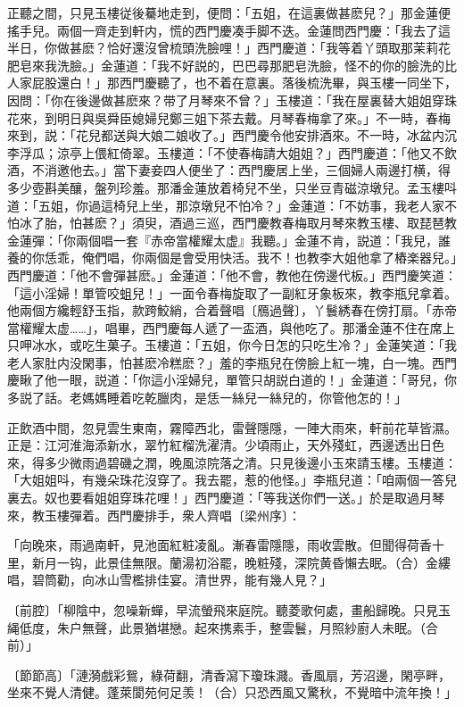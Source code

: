 正聽之間，只見玉樓従後驀地走到，便問：「五姐，在這裏做甚麽兒？」那金蓮便搖手兒。兩個一齊走到軒内，慌的西門慶凑手脚不迭。金蓮問西門慶：「我去了這半日，你做甚麽？恰好還沒曾梳頭洗臉哩！」西門慶道：「我等着丫頭取那茉莉花肥皂來我洗臉。」金蓮道：「我不好説的，巴巴尋那肥皂洗臉，怪不的你的臉洗的比人家屁股還白！」那西門慶聽了，也不着在意裏。落後梳洗畢，與玉樓一同坐下，因問：「你在後邊做甚麽來？带了月琴來不曾？」玉樓道：「我在屋裏替大姐姐穿珠花來，到明日與吳舜臣媳婦兒鄭三姐下茶去戴。月琴春梅拿了來。」不一時，春梅來到，説：「花兒都送與大娘二娘收了。」西門慶令他安排酒來。不一時，冰盆内沉李浮瓜；涼亭上偎紅倚翠。玉樓道：「不使春梅請大姐姐？」西門慶道：「他又不飲酒，不消邀他去。」當下妻妾四人便坐了：西門慶居上坐，三個婦人兩邊打横，得多少壺斟美釀，盤列珍羞。那潘金蓮放着椅兒不坐，只坐豆青磁涼墩兒。孟玉樓呌道：「五姐，你過這椅兒上坐，那涼墩兒不怕冷？」金蓮道：「不妨事，我老人家不怕冰了胎，怕甚麽？」須臾，酒過三巡，西門慶教春梅取月琴來教玉樓、取琵琶教金蓮彈：「你兩個唱一套『赤帝當權耀太虚』我聽。」金蓮不肯，説道：「我兒，誰養的你恁乖，俺們唱，你兩個是會受用快活。我不！也教李大姐他拿了樁楽器兒。」西門慶道：「他不會彈甚麽。」金蓮道：「他不會，教他在傍邊代板。」西門慶笑道：「這小淫婦！單管咬蛆兒！」一面令春梅旋取了一副紅牙象板來，教李瓶兒拿着。他兩個方纔輕舒玉指，款跨鮫綃，合着聲唱〔鴈過聲〕，丫鬟綉春在傍打扇。「赤帝當權耀太虚……」，唱畢，西門慶每人遞了一盃酒，與他吃了。那潘金蓮不住在席上只呷冰水，或吃生菓子。玉樓道：「五姐，你今日怎的只吃生冷？」金蓮笑道：「我老人家肚内没閑事，怕甚麽冷糕麽？」羞的李瓶兒在傍臉上紅一塊，白一塊。西門慶瞅了他一眼，説道：「你這小淫婦兒，單管只胡説白道的！」金蓮道：「哥兒，你多説了話。老媽媽睡着吃乾臘肉，是恁一絲兒一絲兒的，你管他怎的！」

正飲酒中間，忽見雲生東南，霧障西北，雷聲隱隱，一陣大雨來，軒前花草皆濕。正是：江河淮海添新水，翠竹紅榴洗濯清。少頃雨止，天外殘虹，西邊透出日色來，得多少微雨過碧磯之潤，晚風涼院落之清。只見後邊小玉來請玉樓。玉樓道：「大姐姐呌，有幾朵珠花沒穿了。我去罷，惹的他怪。」李瓶兒道：「咱兩個一答兒裏去。奴也要看姐姐穿珠花哩！」西門慶道：「等我送你們一送。」於是取過月琴來，教玉樓彈着。西門慶排手，衆人齊唱〔梁州序〕：

\begin{myquote}
「向晚來，雨過南軒，見池面紅粧凌亂。漸春雷隱隱，雨收雲散。但聞得荷香十里，新月一钩，此景佳無限。蘭湯初浴罷，晚粧殘，深院黄昏懶去眠。{\marktext（合）}金縷唱，碧筒勸，向冰山雪檻排佳宴。清世界，能有幾人見？」

{\markfont〔前腔〕}「柳陰中，忽噪新蟬，早流螢飛來庭院。聽菱歌何處，畫船歸晚。只見玉䋲低度，朱户無聲，此景猶堪戀。起來携素手，整雲鬟，月照紗廚人未眠。{\marktext（合前）}」

{\markfont〔節節高〕}「漣漪戲彩鴛，綠荷翻，清香瀉下瓊珠濺。香風扇，芳沼邊，閑亭畔，坐來不覺人清健。蓬萊閬苑何足羡！{\marktext（合）}只恐西風又驚秋，不覺暗中流年換！」
\end{myquote}

